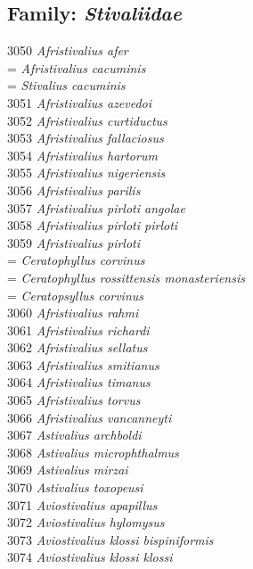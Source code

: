 \documentclass[
]{article}
\begin{document}
\hypertarget{family-stivaliidae}{%
\subsection{\texorpdfstring{Family:
\emph{Stivaliidae}}{Family: Stivaliidae}}\label{family-stivaliidae}}

3050 \emph{Afristivalius afer}\\
= \emph{Afristivalius cacuminis}\\
= \emph{Stivalius cacuminis}\\
3051 \emph{Afristivalius azevedoi}\\
3052 \emph{Afristivalius curtiductus}\\
3053 \emph{Afristivalius fallaciosus}\\
3054 \emph{Afristivalius hartorum}\\
3055 \emph{Afristivalius nigeriensis}\\
3056 \emph{Afristivalius parilis}\\
3057 \emph{Afristivalius pirloti angolae}\\
3058 \emph{Afristivalius pirloti pirloti}\\
3059 \emph{Afristivalius pirloti}\\
= \emph{Ceratophyllus corvinus}\\
= \emph{Ceratophyllus rossittensis monasteriensis}\\
= \emph{Ceratopsyllus corvinus}\\
3060 \emph{Afristivalius rahmi}\\
3061 \emph{Afristivalius richardi}\\
3062 \emph{Afristivalius sellatus}\\
3063 \emph{Afristivalius smitianus}\\
3064 \emph{Afristivalius timanus}\\
3065 \emph{Afristivalius torvus}\\
3066 \emph{Afristivalius vancanneyti}\\
3067 \emph{Astivalius archboldi}\\
3068 \emph{Astivalius microphthalmus}\\
3069 \emph{Astivalius mirzai}\\
3070 \emph{Astivalius toxopeusi}\\
3071 \emph{Aviostivalius apapillus}\\
3072 \emph{Aviostivalius hylomysus}\\
3073 \emph{Aviostivalius klossi bispiniformis}\\
3074 \emph{Aviostivalius klossi klossi}\\
\end{document}
